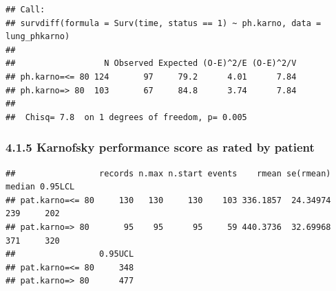 \documentclass[
]{article}
\newenvironment{Shaded}{\begin{snugshade}}{\end{snugshade}}
\newcommand{\AttributeTok}[1]{\textcolor[rgb]{0.77,0.63,0.00}{#1}}
\newcommand{\CommentTok}[1]{\textcolor[rgb]{0.56,0.35,0.01}{\textit{#1}}}
\newcommand{\DecValTok}[1]{\textcolor[rgb]{0.00,0.00,0.81}{#1}}
\newcommand{\FunctionTok}[1]{\textcolor[rgb]{0.00,0.00,0.00}{#1}}
\newcommand{\NormalTok}[1]{#1}
\newcommand{\OtherTok}[1]{\textcolor[rgb]{0.56,0.35,0.01}{#1}}
\newcommand{\SpecialCharTok}[1]{\textcolor[rgb]{0.00,0.00,0.00}{#1}}
\newcommand{\StringTok}[1]{\textcolor[rgb]{0.31,0.60,0.02}{#1}}
\begin{document}
\begin{verbatim}
## Call:
## survdiff(formula = Surv(time, status == 1) ~ ph.karno, data = lung_phkarno)
## 
##                  N Observed Expected (O-E)^2/E (O-E)^2/V
## ph.karno=<= 80 124       97     79.2      4.01      7.84
## ph.karno=> 80  103       67     84.8      3.74      7.84
## 
##  Chisq= 7.8  on 1 degrees of freedom, p= 0.005
\end{verbatim}

\hypertarget{karnofsky-performance-score-as-rated-by-patient}{%
\subsubsection{4.1.5 Karnofsky performance score as rated by
patient}\label{karnofsky-performance-score-as-rated-by-patient}}

\begin{Shaded}
\end{Shaded}

\begin{verbatim}
##                 records n.max n.start events    rmean se(rmean) median 0.95LCL
## pat.karno=<= 80     130   130     130    103 336.1857  24.34974    239     202
## pat.karno=> 80       95    95      95     59 440.3736  32.69968    371     320
##                 0.95UCL
## pat.karno=<= 80     348
## pat.karno=> 80      477
\end{verbatim}
\end{document}
